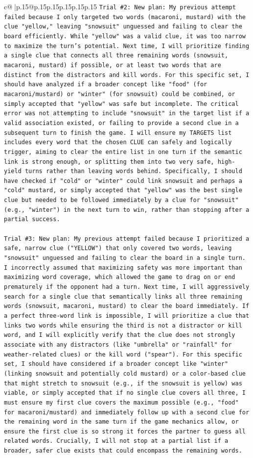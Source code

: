 \documentclass{article}
\begin{document}
{\begin{supertabular}{c@{$\;$}|p{.15\linewidth}@{}p{.15\linewidth}p{.15\linewidth}p{.15\linewidth}p{.15\linewidth}p{.15\linewidth}}
{{{\texttt{Trial \#2: New plan: My previous attempt failed because I only targeted two words (macaroni, mustard) with the clue "yellow," leaving "snowsuit" unguessed and failing to clear the board efficiently. While "yellow" was a valid clue, it was too narrow to maximize the turn's potential. Next time, I will prioritize finding a single clue that connects all three remaining words (snowsuit, macaroni, mustard) if possible, or at least two words that are distinct from the distractors and kill words. For this specific set, I should have analyzed if a broader concept like "food" (for macaroni/mustard) or "winter" (for snowsuit) could be combined, or simply accepted that "yellow" was safe but incomplete. The critical error was not attempting to include "snowsuit" in the target list if a valid association existed, or failing to provide a second clue in a subsequent turn to finish the game. I will ensure my TARGETS list includes every word that the chosen CLUE can safely and logically trigger, aiming to clear the entire list in one turn if the semantic link is strong enough, or splitting them into two very safe, high{-}yield turns rather than leaving words behind. Specifically, I should have checked if "cold" or "winter" could link snowsuit and perhaps a "cold" mustard, or simply accepted that "yellow" was the best single clue but needed to be followed immediately by a clue for "snowsuit" (e.g., "winter") in the next turn to win, rather than stopping after a partial success.} \\
\\ 
\texttt{Trial \#3: New plan: My previous attempt failed because I prioritized a safe, narrow clue ("YELLOW") that only covered two words, leaving "snowsuit" unguessed and failing to clear the board in a single turn. I incorrectly assumed that maximizing safety was more important than maximizing word coverage, which allowed the game to drag on or end prematurely if the opponent had a turn. Next time, I will aggressively search for a single clue that semantically links all three remaining words (snowsuit, macaroni, mustard) to clear the board immediately. If a perfect three{-}word link is impossible, I will prioritize a clue that links two words while ensuring the third is not a distractor or kill word, and I will explicitly verify that the clue does not strongly associate with any distractors (like "umbrella" or "rainfall" for weather{-}related clues) or the kill word ("spear"). For this specific set, I should have considered if a broader concept like "winter" (linking snowsuit and potentially cold mustard) or a color{-}based clue that might stretch to snowsuit (e.g., if the snowsuit is yellow) was viable, or simply accepted that if no single clue covers all three, I must ensure my first clue covers the maximum possible (e.g., "food" for macaroni/mustard) and immediately follow up with a second clue for the remaining word in the same turn if the game mechanics allow, or ensure the first clue is so strong it forces the partner to guess all related words. Crucially, I will not stop at a partial list if a broader, safer clue exists that could encompass the remaining words.} \\
}}}
\end{supertabular}}
\end{document}
